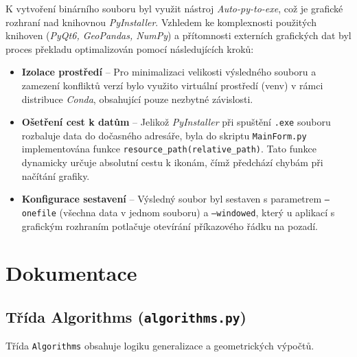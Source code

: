 \documentclass[11pt, a4paper]{article}
\begin{document}
K vytvoření binárního souboru byl využit nástroj \textit{Auto-py-to-exe}, což je grafické rozhraní nad knihovnou \textit{PyInstaller}. Vzhledem ke komplexnosti použitých knihoven (\textit{PyQt6, GeoPandas, NumPy}) a přítomnosti externích grafických dat byl proces překladu optimalizován pomocí následujících kroků:

\begin{itemize}
    \item \textbf{Izolace prostředí} -- Pro minimalizaci velikosti výsledného souboru a zamezení konfliktů verzí bylo využito virtuální prostředí (venv) v rámci distribuce \textit{Conda}, obsahující pouze nezbytné závislosti.
    \item \textbf{Ošetření cest k datům} -- Jelikož \textit{PyInstaller} při spuštění \texttt{.exe} souboru rozbaluje data do dočasného adresáře, byla do skriptu \texttt{MainForm.py} implementována funkce \texttt{resource\_path(relative\_path)}. Tato funkce dynamicky určuje absolutní cestu k ikonám, čímž předchází chybám při načítání grafiky.
    \newpage
    
    \item \textbf{Konfigurace sestavení} -- Výsledný soubor byl sestaven s parametrem \texttt{--onefile} (všechna data v jednom souboru) a \texttt{--windowed}, který u aplikací s grafickým rozhraním potlačuje otevírání příkazového řádku na pozadí.
\end{itemize}

\section{Dokumentace}

\subsection{Třída Algorithms (\texttt{algorithms.py})}
Třída \texttt{Algorithms} obsahuje logiku generalizace a geometrických výpočtů.
\end{document}
